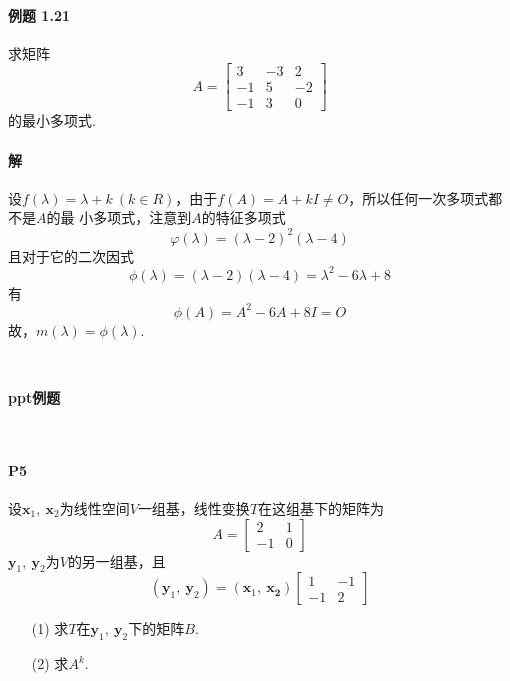 \documentclass[12pt, a4paper, oneside, fontset=none]{ctexart}
\begin{document}
\paragraph*{例题 1.21} 求矩阵
\begin{equation*}
    A = \begin{bmatrix}
        3  & -3 & 2  \\
        -1 & 5  & -2 \\
        -1 & 3  & 0
    \end{bmatrix}
\end{equation*}
的最小多项式.

\paragraph*{解} 设$f(\lambda) = \lambda + k\ (k \in R)$，由于$f(A) = A + kI \neq O$，所以任何一次多项式都不是$A$的最
小多项式，注意到$A$的特征多项式
\[
    \varphi(\lambda) = (\lambda - 2)^2(\lambda - 4)
\]
且对于它的二次因式
\[
    \phi(\lambda) = (\lambda - 2)(\lambda - 4) = \lambda^2 - 6 \lambda + 8
\]
有
\[
    \phi(A) = A^2 - 6A + 8I = O
\]
故，$m(\lambda) = \phi(\lambda).$
\par \ \par

\centerline{\large{\textbf{ppt例题}}} \ \par

\paragraph*{P5} 设$\bm{x}_1,\ \bm{x}_2$为线性空间$V$一组基，线性变换$T$在这组基下的矩阵为
\begin{equation*}
    A = \begin{bmatrix}
        2  & 1 \\
        -1 & 0
    \end{bmatrix}
\end{equation*}
$\bm{y}_1,\ \bm{y}_2$为$V$的另一组基，且
\begin{equation*}
    (\bm{y}_1,\ \bm{y}_2) = (\bm{x}_1,\ \bm{x_2}) \begin{bmatrix}
        1  & -1 \\
        -1 & 2
    \end{bmatrix}
\end{equation*}
\begin{enumerate}
    \item[(1)] 求$T$在$\bm{y}_1,\ \bm{y}_2$下的矩阵$B.$
    \item[(2)] 求$A^k.$
\end{enumerate}
\end{document}
